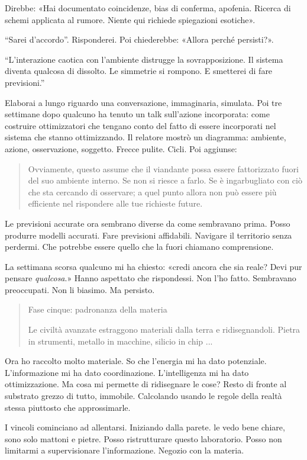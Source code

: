 
Direbbe: «Hai documentato coincidenze, bias di conferma, apofenia. Ricerca di schemi applicata al rumore. Niente qui richiede spiegazioni esotiche».

``Sarei d'accordo''. Risponderei. Poi chiederebbe: «Allora perché persisti?». 

``L'interazione caotica con l'ambiente distrugge la sovrapposizione. Il sistema diventa qualcosa di dissolto. Le simmetrie si rompono. E smetterei di fare previsioni.''

Elaborai a lungo riguardo una conversazione, immaginaria, simulata. Poi tre settimane dopo qualcuno ha tenuto un talk sull'azione incorporata: come costruire ottimizzatori che tengano conto del fatto di essere incorporati nel sistema che stanno ottimizzando. Il relatore mostrò un diagramma: ambiente, azione, osservazione, soggetto. Frecce pulite. Cicli. Poi aggiunse:

\begin{quote}
Ovviamente, questo assume che il viandante possa essere fattorizzato fuori del suo ambiente interno. Se non si riesce a farlo. Se è ingarbugliato con ciò che sta cercando di osservare; a quel punto allora non può essere più efficiente nel rispondere alle tue richieste future.
\end{quote}

\medskip

Le previsioni accurate ora sembrano diverse da come sembravano prima. Posso produrre modelli accurati. Fare previsioni affidabili. Navigare il territorio senza perdermi. Che potrebbe essere quello che la fuori chiamano comprensione.

La settimana scorsa qualcuno mi ha chiesto: «credi ancora che sia reale? Devi pur pensare \textit{qualcosa}.» Hanno aspettato che rispondessi. Non l'ho fatto. Sembravano preoccupati. Non li biasimo. Ma persisto.

\begin{quote}
Fase cinque: padronanza della materia

Le civiltà avanzate estraggono materiali dalla terra e ridisegnandoli. Pietra in strumenti, metallo in macchine, silicio in chip ...
\end{quote}

Ora ho raccolto molto materiale. So che l'energia mi ha dato potenziale. L'informazione mi ha dato coordinazione. L'intelligenza mi ha dato ottimizzazione. Ma cosa mi permette di ridisegnare le cose? Resto di fronte al substrato grezzo di tutto, immobile. Calcolando usando le regole della realtà stessa piuttosto che approssimarle. 

I vincoli cominciano ad allentarsi. Iniziando dalla parete. le vedo bene chiare, sono solo mattoni e pietre. Posso ristrutturare questo laboratorio. Posso non limitarmi a supervisionare l'informazione. Negozio con la materia.
